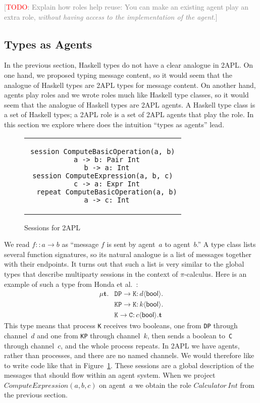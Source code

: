 \documentclass[conference,compsoc]{IEEEtran} %
\newcommand{\todo}[1]{{\small \textcolor{gray}{[\textcolor{red}{TODO}: #1]}}}
\begin{document}

\todo{Explain how roles help reuse: You can make an existing agent play an
extra role, \emph{without having access to the implementation of the
agent}.}

\subsection{Types as Agents} %

In the previous section, Haskell types do not have a clear analogue in
2APL. On one hand, we proposed typing message content, so it would seem
that the analogue of Haskell types are 2APL types for message content. On
another hand, agents play roles and we wrote roles much like Haskell type
classes, so it would seem that the analogue of Haskell types are 2APL
agents. A Haskell type class is a set of Haskell types; a 2APL role is a
set of 2APL agents that play the role. In this section we explore where
does the intuition ``types as agents'' lead.

\begin{figure}\footnotesize %
\begin{center}
\begin{tabular}{c}
\begin{lstlisting}[style=me]
session ComputeBasicOperation(a, b)
  a -> b: Pair Int
  b -> a: Int
session ComputeExpression(a, b, c)
  c -> a: Expr Int
  repeat ComputeBasicOperation(a, b)
  a -> c: Int
\end{lstlisting}
\end{tabular}
\end{center}
\caption{Sessions for 2APL}\label{fig:sessions}
\end{figure} %

{\def\l#1->#2:#3<#4>{\mathtt{#1}\to\mathtt{#2}:#3\langle\mathsf{#4}\rangle}
We read $f::a\to b$ as ``message $f$ is sent by agent~$a$ to agent~$b$.'' A
type class lists several function signatures, so its natural analogue is a
list of messages together with their endpoints. It turns out that such a
list is very similar to the global types that describe multiparty sessions
in the context of $\pi$-calculus. Here is an example of such a type from
Honda et al.~\cite{dblp:conf/popl/hondayc08}:
\begin{align*}
\mu\mathbf{t}. 
  &\l DP->K:d<bool>. \\
  &\l KP->K:k<bool>. \\
  &\l K->C:c<bool>.\mathbf{t}
\end{align*}
This type means that process \texttt{K} receives two booleans, one from
\texttt{DP} through channel~$d$ and one from \texttt{KP} through
channel~$k$, then sends a boolean to~\texttt{C} through channel~$c$, and
the whole process repeats. In 2APL we have agents, rather than processes,
and there are no named channels. We would therefore like to write code like
that in Figure~\ref{fig:sessions}.  These sessions are a global description
of the messages that should flow within an agent system. When we project
$\mathit{ComputeExpression}(a,b,c)$ on agent~$a$ we obtain the role
$\mathit{Calculator}\,\mathit{Int}$ from the previous section.}
\end{document}
